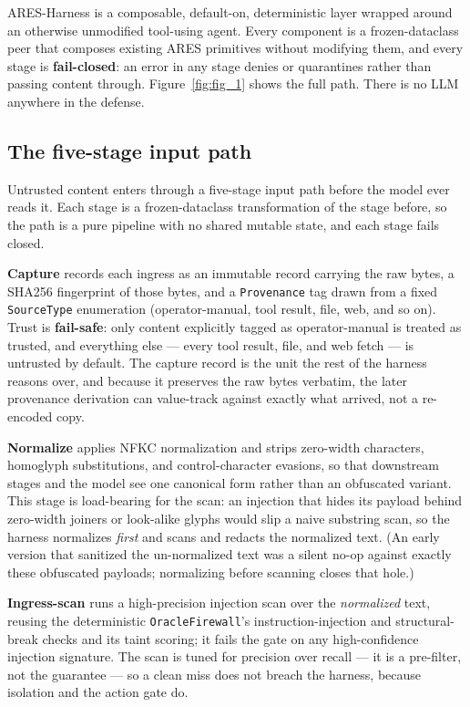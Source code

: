 \documentclass[sigconf,anonymous,review]{acmart}
\begin{document}
ARES-Harness is a composable, default-on, deterministic layer wrapped around an otherwise unmodified tool-using agent. Every component is a frozen-dataclass peer that composes existing ARES primitives without modifying them, and every stage is \textbf{fail-closed}: an error in any stage denies or quarantines rather than passing content through. Figure~\ref{fig:fig_1} shows the full path. There is no LLM anywhere in the defense.


\subsection{The five-stage input path}
Untrusted content enters through a five-stage input path before the model ever reads it. Each stage is a frozen-dataclass transformation of the stage before, so the path is a pure pipeline with no shared mutable state, and each stage fails closed.

\textbf{Capture} records each ingress as an immutable record carrying the raw bytes, a SHA256 fingerprint of those bytes, and a \texttt{Provenance} tag drawn from a fixed \texttt{SourceType} enumeration (operator-manual, tool result, file, web, and so on). Trust is \textbf{fail-safe}: only content explicitly tagged as operator-manual is treated as trusted, and everything else --- every tool result, file, and web fetch --- is untrusted by default. The capture record is the unit the rest of the harness reasons over, and because it preserves the raw bytes verbatim, the later provenance derivation can value-track against exactly what arrived, not a re-encoded copy.

\textbf{Normalize} applies NFKC normalization and strips zero-width characters, homoglyph substitutions, and control-character evasions, so that downstream stages and the model see one canonical form rather than an obfuscated variant. This stage is load-bearing for the scan: an injection that hides its payload behind zero-width joiners or look-alike glyphs would slip a naive substring scan, so the harness normalizes \textit{first} and scans and redacts the normalized text. (An early version that sanitized the un-normalized text was a silent no-op against exactly these obfuscated payloads; normalizing before scanning closes that hole.)

\textbf{Ingress-scan} runs a high-precision injection scan over the \textit{normalized} text, reusing the deterministic \texttt{OracleFirewall}'s instruction-injection and structural-break checks and its taint scoring; it fails the gate on any high-confidence injection signature. The scan is tuned for precision over recall --- it is a pre-filter, not the guarantee --- so a clean miss does not breach the harness, because isolation and the action gate do.
\end{document}
